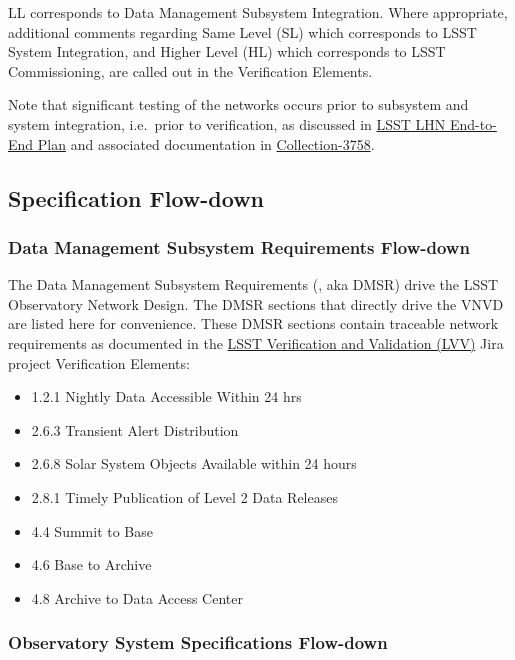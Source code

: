 \documentclass[DM,lsstdraft,STS,toc]{lsstdoc}
\begin{document}
LL corresponds to Data Management Subsystem Integration.
Where appropriate, additional comments regarding Same Level (SL) which corresponds to LSST System Integration, and Higher Level (HL) which corresponds to LSST Commissioning, are called out in the Verification Elements.

Note that significant testing of the networks occurs prior to subsystem and system integration, i.e.\  prior to verification, as discussed in \href{https://ls.st/document-14789}{LSST LHN End-to-End Plan} and associated documentation in \href{https://docushare.lsstcorp.org/docushare/dsweb/View/Collection-3758}{Collection-3758}.

\subsection{Specification Flow-down}\label{sec:sepcflowd}

\subsubsection{Data Management Subsystem Requirements Flow-down}\label{sec:dmreqflowd}

The Data Management Subsystem Requirements (, aka DMSR) drive the LSST Observatory Network Design.
The DMSR sections that directly drive the VNVD are listed here for convenience.
These DMSR sections contain traceable network requirements as documented in the \href{https://jira.lsstcorp.org/projects/LVV/}{LSST Verification and Validation (LVV)} Jira project Verification Elements:

\begin{itemize}
\item 1.2.1 Nightly Data Accessible Within 24 hrs
\item 2.6.3 Transient Alert Distribution
\item 2.6.8 Solar System Objects Available within 24 hours
\item 2.8.1 Timely Publication of Level 2 Data Releases
\item 4.4 Summit to Base
\item 4.6 Base to Archive
\item 4.8 Archive to Data Access Center
\end{itemize}

\subsubsection{Observatory System Specifications Flow-down}\label{sec:ossflowd}
\end{document}
